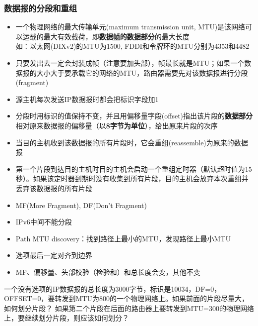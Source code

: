 \subsubsection{数据报的分段和重组}
\begin{itemize}
\item 一个物理网络的最大传输单元(maximum transmission unit, MTU)是该网络可以运载的最大有效载荷，即\textbf{数据\underline{帧}的数据部分}的最大长度\\
如：以太网(DIXv2)的MTU为1500, FDDI和令牌环的MTU分别为4353和4482
\item 只要发出去一定会封装成帧（注意要加头部），帧最长就是MTU；如果一个数据报的大小大于要承载它的网络的MTU，路由器需要先对该数据报进行分段(fragment)
\item 源主机每次发送IP数据报时都会把标识字段加1
\item 分段时用标识的值保持不变，并且用偏移量字段(offset)指出该片段的\textbf{数据部分}相对原来数据报的偏移量（以\textbf{8字节为单位}），给出原来片段的次序
\item 当目的主机收到该数据报的所有片段时，它会重组(reassemble)为原来的数据报
\item 第一个片段到达目的主机时目的主机会启动一个重组定时器（默认超时值为15秒）。如果该定时器到期时没有收集到所有片段，目的主机会放弃本次重组并丢弃该数据报的所有片段
\item MF(More Fragment), DF(Don't Fragment)
\item IPv6中间不能分段
\item Path MTU discovery：找到路径上最小的MTU，发现路径上最小MTU
\item 选项最后一定对齐到边界
\item MF、偏移量、头部校验（检验和）和总长度会变，其他不变
\end{itemize}
\begin{example}
	一个没有选项的IP数据报的总长度为3000字节，标识是10034，DF=0，OFFSET=0，要转发到MTU为800的一个物理网络上。如果前面的片段尽量大，如何划分片段？
	如果第二个片段在后面的路由器上要转发到MTU=300的物理网络上，要继续划分片段，则应该如何划分？
\end{example}
